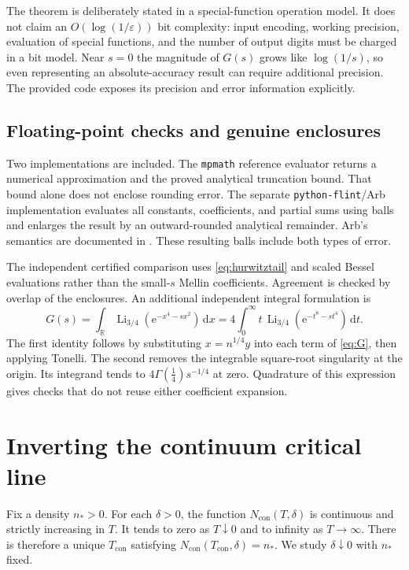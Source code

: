 \documentclass[11pt,a4paper]{article}
\numberwithin{equation}{section}
\theoremstyle{definition}
\newcommand{\R}{\mathbb R}
\newcommand{\dd}{\,\mathrm d}
\newcommand{\Li}{\operatorname{Li}}
\newcommand{\con}{\mathrm{con}}
\newcommand{\e}{\mathrm e}
\newcommand{\gfour}{\Gamma(\tfrac14)}
\begin{document}
The theorem is deliberately stated in a special-function operation
model. It does not claim an $O(\log(1/\varepsilon))$ bit complexity:
input encoding, working precision, evaluation of special functions, and
the number of output digits must be charged in a bit model. Near $s=0$
the magnitude of $G(s)$ grows like $\log(1/s)$, so even representing an
absolute-accuracy result can require additional precision. The provided
code exposes its precision and error information explicitly.

\subsection{Floating-point checks and genuine enclosures}

Two implementations are included. The \texttt{mpmath} reference evaluator
returns a numerical approximation and the proved analytical truncation
bound. That bound alone does not enclose rounding error. The separate
\texttt{python-flint}/Arb implementation evaluates all constants,
coefficients, and partial sums using balls and enlarges the result by an
outward-rounded analytical remainder. Arb's semantics are documented
in \cite{Arbdocs}. These resulting balls include both types of error.

The independent certified comparison uses \eqref{eq:hurwitztail} and
scaled Bessel evaluations rather than the small-$s$ Mellin coefficients.
Agreement is checked by overlap of the enclosures. An additional
independent integral formulation is
\begin{equation}
 G(s)=\int_{\R}\Li_{3/4}(\e^{-x^4-sx^2})\dd x
     =4\int_0^\infty t\,\Li_{3/4}(\e^{-t^8-st^4})\dd t.
 \label{eq:independentintegral}
\end{equation}
The first identity follows by substituting $x=n^{1/4}y$ into each term
of \eqref{eq:G}, then applying Tonelli. The second removes the
integrable square-root singularity at the origin. Its integrand tends
to $4\gfour s^{-1/4}$ at zero. Quadrature of this expression gives
checks that do not reuse either coefficient expansion.

\section{Inverting the continuum critical line}
\label{sec:inverse}

Fix a density $n_*>0$. For each $\delta>0$, the function
$N_{\con}(T,\delta)$ is continuous and strictly increasing in $T$.
It tends to zero as $T\downarrow0$ and to infinity as $T\to\infty$.
There is therefore a unique $T_{\con}$ satisfying
$N_{\con}(T_{\con},\delta)=n_*$. We study $\delta\downarrow0$ with
$n_*$ fixed.
\end{document}
